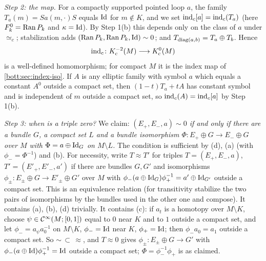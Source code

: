 \emph{Step 2: the map.} For a compactly supported pointed loop $a$, the family
$T_a(m)=Sa(m,\cdot)S$ equals $\operatorname{Id}$ for $m\notin K$, and we set
$\operatorname{ind}_c[a]=\operatorname{ind}_c(T_a)$ (here $F^0_k=\operatorname{Ran} P_k$ and $\kappa=\operatorname{Id}$). By Step 1(b) this depends
only on the class of $a$ under $\simeq_c$; stabilization adds
$(\operatorname{Ran} P_k,\operatorname{Ran} P_k,\operatorname{Id})\sim0$; and $T_{\operatorname{diag}(a,b)}=T_a\oplus T_b$. Hence
\begin{equation*}
  \operatorname{ind}_c\colon K_{\mathrm{c}}^{-2}(M)\longrightarrow K_{\mathrm{c}}^0(M)
\end{equation*}
is a well-defined homomorphism; for compact $M$ it is the index map of
\cref{bott:sec:index-iso}. If $A$ is any elliptic family with symbol $a$ which equals a
constant $A^0$ outside a compact set, then $(1-t)T_a+tA$ has constant symbol and is
independent of $m$ outside a compact set, so $\operatorname{ind}_c(A)=\operatorname{ind}_c[a]$ by Step 1(b).

\emph{Step 3: when is a triple zero?} We claim: \emph{$(E_+,E_-,a)\sim0$ if and only if
there are a bundle $G$, a compact set $L$ and a bundle isomorphism
$\Phi\colon E_+\oplus G\to E_-\oplus G$ over $M$ with $\Phi=a\oplus\operatorname{Id}_G$ on $M\setminus L$.}
The condition is sufficient by (d), (a) (with $\phi_-=\Phi^{-1}$) and (b). For necessity,
write $T\approx T'$ for triples $T=(E_+,E_-,a)$, $T'=(E'_+,E'_-,a')$ if there are bundles
$G,G'$ and isomorphisms $\phi_\pm\colon E_\pm\oplus G\to E'_\pm\oplus G'$ over $M$ with
$\phi_-(a\oplus\operatorname{Id}_G)\phi_+^{-1}=a'\oplus\operatorname{Id}_{G'}$ outside a compact set. This is an
equivalence relation (for transitivity stabilize the two pairs of isomorphisms by the
bundles used in the other one and compose). It contains (a), (b), (d) trivially. It contains
(c): if $a_t$ is a homotopy over $M\setminus K$, choose $\psi\in\mathcal{C}^\infty(M;[0,1])$ equal to $0$
near $K$ and to $1$ outside a compact set, and let $\phi_-=a_{\psi}a_0^{-1}$ on $M\setminus K$,
$\phi_-=\operatorname{Id}$ near $K$, $\phi_+=\operatorname{Id}$; then $\phi_-a_0=a_1$ outside a compact set. So
$\sim\,\subset\,\approx$, and $T\approx0$ gives $\phi_\pm\colon E_\pm\oplus G\to G'$ with
$\phi_-(a\oplus\operatorname{Id})\phi_+^{-1}=\operatorname{Id}$ outside a compact set; $\Phi=\phi_-^{-1}\phi_+$ is as
claimed.

